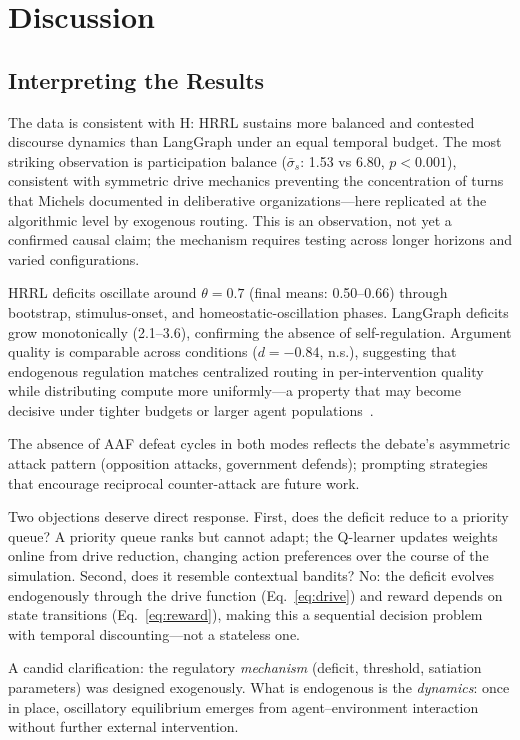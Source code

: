 \documentclass{llncs}
\begin{document}
\section{Discussion}
\label{sec:discussion}

\subsection{Interpreting the Results}

The data is consistent with H: HRRL sustains more balanced and contested
discourse dynamics than LangGraph under an equal temporal budget. The most
striking observation is participation balance ($\bar{\sigma}_s$: 1.53 vs
6.80, $p < 0.001$), consistent with symmetric drive mechanics preventing the
concentration of turns that Michels documented in deliberative
organizations---here replicated at the algorithmic level by exogenous
routing. This is an observation, not yet a confirmed causal claim; the
mechanism requires testing across longer horizons and varied configurations.

HRRL deficits oscillate around $\theta = 0.7$ (final means: 0.50--0.66)
through bootstrap, stimulus-onset, and homeostatic-oscillation phases.
LangGraph deficits grow monotonically (2.1--3.6), confirming the absence
of self-regulation. Argument quality is comparable across conditions
($d = -0.84$, n.s.), suggesting that endogenous regulation matches
centralized routing in per-intervention quality while distributing compute
more uniformly---a property that may become decisive under tighter budgets
or larger agent populations~\parencite{snell2024scaling}.

The absence of AAF defeat cycles in both modes reflects the debate's
asymmetric attack pattern (opposition attacks, government defends);
prompting strategies that encourage reciprocal counter-attack are future
work.

Two objections deserve direct response. First, does the deficit reduce to
a priority queue? A priority queue ranks but cannot adapt; the Q-learner
updates weights online from drive reduction, changing action preferences
over the course of the simulation. Second, does it resemble contextual
bandits? No: the deficit evolves endogenously through the drive function
(Eq.~\ref{eq:drive}) and reward depends on state transitions
(Eq.~\ref{eq:reward}), making this a sequential decision problem with
temporal discounting---not a stateless one.

A candid clarification: the regulatory \emph{mechanism} (deficit, threshold,
satiation parameters) was designed exogenously. What is endogenous is the
\emph{dynamics}: once in place, oscillatory equilibrium emerges from
agent--environment interaction without further external intervention.
\end{document}
